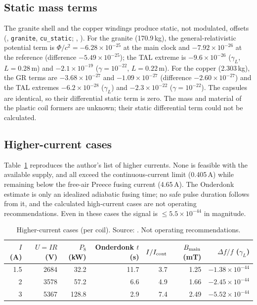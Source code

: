 \documentclass[12pt,a4paper]{article}
\newcommand{\e}[1]{\times10^{#1}}
\newcommand{\filec}[1]{\texttt{\detokenize{#1}}}
\begin{document}
\subsection{Static mass terms}
The granite shell and the copper windings produce static, not modulated, offsets
(, \texttt{granite}, \texttt{cu\_static};
, ). For the granite
(170.9\,kg), the general-relativistic potential term is $\Phi/c^2=-6.28\times10^{-25}$ at the main clock and
$-7.92\times10^{-26}$ at the reference (difference $-5.49\times10^{-25}$); the TAL extreme is
$-9.6\times10^{-26}$ ($\gamma_L$, $L=0.28$\,m) and $-2.1\times10^{-19}$ ($\gamma=10^{-22}$, $L=0.22$\,m). For the
copper (2.303\,kg), the GR terms are $-3.68\times10^{-27}$ and $-1.09\times10^{-27}$ (difference
$-2.60\times10^{-27}$) and the TAL extremes $-6.2\times10^{-28}$ ($\gamma_L$) and $-2.3\times10^{-22}$
($\gamma=10^{-22}$). The capsules are identical, so their differential static term is zero. The mass and material of
the plastic coil formers are unknown; their static differential term could not be calculated.

\subsection{Higher-current cases}
Table~\ref{tab:highI} reproduces the author's list of higher currents. None is feasible with the available supply,
and all exceed the continuous-current limit (0.405\,A) while remaining below the free-air Preece fusing current
(4.65\,A). The Onderdonk estimate is only an idealized adiabatic fusing time; no safe pulse duration follows from
it, and the calculated high-current cases are not operating recommendations. Even in these cases the signal is
$\le5.5\times10^{-44}$ in magnitude.

\begin{table}[t]
\centering
\caption{Higher-current cases (per coil). Source: \filec{csv/fixed_case_and_feasibility.csv}.
Not operating recommendations.}
\label{tab:highI}
\small
\begin{tabular}{rrrrrrr}
\toprule
$I$ (A) & $U=IR$ (V) & $P_8$ (kW) & Onderdonk $t$ (s) & $I/I_{\rm cont}$ & $B_{\rm main}$ (mT) & $\Delta f/f$ ($\gamma_L$)\\
\midrule
1.5 & 2684 & 32.2 & 11.7 & 3.7 & 1.25 & $-1.38\e{-44}$\\
2   & 3578 & 57.2 & 6.6  & 4.9 & 1.66 & $-2.45\e{-44}$\\
3   & 5367 & 128.8 & 2.9 & 7.4 & 2.49 & $-5.52\e{-44}$\\
\bottomrule
\end{tabular}
\end{table}
\end{document}
